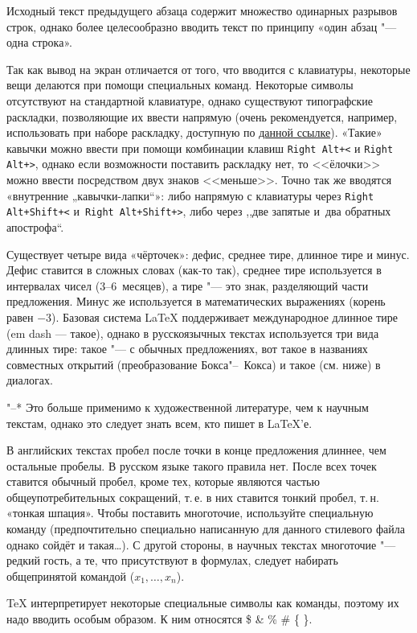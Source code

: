 \documentclass[final,pdftex]{epsilonj}
\numberwithin{equation}{section}
\begin{document}
Исходный текст предыдущего абзаца содержит множество одинарных разрывов строк, однако более целесообразно вводить текст по принципу «один абзац "--- одна строка».

Так как вывод на экран отличается от того, что вводится с клавиатуры, некоторые вещи делаются при помощи специальных команд. Некоторые символы отсутствуют на стандартной клавиатуре, однако существуют типографские раскладки, позволяющие их ввести напрямую (очень рекомендуется, например, использовать при наборе раскладку, доступную по \href{http://ilyabirman.ru/projects/typography-layout/}{данной ссылке}). 
«Такие» кавычки можно ввести при помощи комбинации клавиш \texttt{Right Alt+<} и \texttt{Right Alt+>}, однако если возможности поставить раскладку нет, то <<ёлочки>> можно ввести посредством двух знаков <<меньше>>. Точно так же вводятся «внутренние „кавычки-лапки“»: либо напрямую с клавиатуры через \texttt{Right Alt+Shift+<} и~\texttt{Right Alt+Shift+>}, либо через ,,две запятые и~два обратных апострофа``.

Существует четыре вида «чёрточек»: дефис, среднее тире, длинное тире и минус. Дефис ставится в сложных словах (как-то так), среднее тире используется в интервалах чисел (3--6~месяцев), а тире "--- это знак, разделяющий части предложения. Минус же используется в математических выражениях (корень равен $-3$). Базовая система \LaTeX{} поддерживает международное длинное тире (em dash --- такое), однако в русскоязычных текстах используется три вида длинных тире: такое "--- с обычных предложениях, вот такое в названиях совместных открытий (преобразование Бокса"--~Кокса) и такое (см. ниже) в диалогах.

"--* Это больше применимо к художественной литературе, чем к научным текстам, однако это следует знать всем, кто пишет в \LaTeX'е.

В английских текстах пробел после точки в конце предложения длиннее, чем остальные пробелы. В русском языке такого правила нет. После всех точек ставится обычный пробел, кроме тех, которые являются частью общеупотребительных сокращений, т.\,е. в них ставится тонкий пробел, т.\,н. «тонкая шпация». Чтобы поставить многоточие, используйте специальную команду (предпочтительно специально написанную для данного стилевого файла\ldotst{} однако сойдёт и такая\ldots{}). С другой стороны, в научных текстах многоточие "--- редкий гость, а те, что присутствуют в формулах, следует набирать общепринятой командой ($x_1, \ldots, x_n$).

\TeX{} интерпретирует некоторые специальные символы  как команды, поэтому их надо вводить особым образом. К ним относятся 
       \$ \& \% \# \{ \}.
\end{document}
